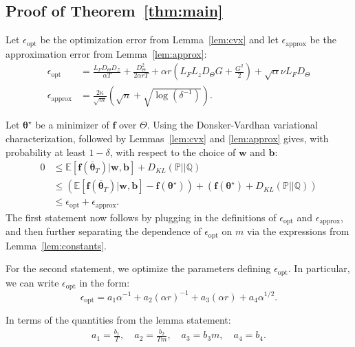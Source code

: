 \documentclass[twoside]{article}
\theoremstyle{definition}
\newcommand{\E}{\mathbb{E}}
\newcommand{\Prob}{\mathbb{P}}
\newcommand{\Q}{\mathbb{Q}}
\newcommand{\cZ}{\mathcal{Z}}
\newcommand{\1}[1]{\scalebox{1.25}{$\mathds{1}$}\left[#1\right]}
\begin{document}
\subsection{Proof of  Theorem~\ref{thm:main}}
\label{appss:pf}
Let $\epsilon_{\mathrm{opt}}$ be the optimization error from Lemma~\ref{lem:cvx} and let $\epsilon_{\mathrm{approx}}$ be the approximation error from Lemma~\ref{lem:approx}:
\begin{align*}
    \epsilon_{\mathrm{opt}}&=\frac{L_F D_{\Theta} D_{\cZ}}{\alpha T}+\frac{D_{\Theta}^2}{2\alpha r T}+
\alpha r\left(
L_FL_z D_{\Theta}G+\frac{G^2}{2}
\right)
+\sqrt{\alpha}\nu L_F D_{\Theta}\\
\epsilon_{\mathrm{approx}}&=\frac{2\kappa}{\sqrt{m}}\left(\sqrt{n}+\sqrt{\log(\delta^{-1})}\right).
\end{align*}

Let $\bm{\theta}^\star$ be a minimizer of $\bm{f}$ over $\Theta$. 
Using the Donsker-Vardhan variational characterization, followed by Lemmas~\ref{lem:cvx} and \ref{lem:approx} gives, with probability at least $1-\delta$, with respect to the choice of $\bm{w}$ and $\bm{b}$:
\begin{align*}
0&\le \E[\bm{f}(\overline{\bm{\theta}}_T)|\bm{w},\bm{b}]+D_{KL}(\Prob||\Q) \\
&\le \left(
\E[\bm{f}(\overline{\bm{\theta}}_T)|\bm{w},\bm{b}]-\bm{f}(\bm{\theta}^\star)
\right) 
+\left(
\bm{f}(\bm{\theta}^\star)+
D_{KL}(\Prob||\Q)
\right)\\
&\le \epsilon_{\mathrm{opt}}+\epsilon_{\mathrm{approx}}.
\end{align*}
The first statement now follows by plugging in the definitions of $\epsilon_{\mathrm{opt}}$ and $\epsilon_{\mathrm{approx}}$, and then further separating the dependence of $\epsilon_{\mathrm{opt}}$ on $m$ via the expressions from Lemma~\ref{lem:constants}.

For the second statement, we optimize the parameters defining $\epsilon_{\mathrm{opt}}$. 
In particular, we can write $\epsilon_{\mathrm{opt}}$  in the form:
\begin{equation*}
\epsilon_{\mathrm{opt}}=a_1 \alpha^{-1}+a_2 (\alpha r)^{-1}+a_3 (\alpha r)+a_4 \alpha^{1/2}.
\end{equation*}

In terms of the quantities from the lemma statement:
\begin{align}
\label{eq:constRelation}
a_1 = \frac{b_1}{T}, \quad a_2 = \frac{b_2}{Tm}, \quad a_3 = b_3 m, \quad a_4 = b_4.
\end{align}
\end{document}
